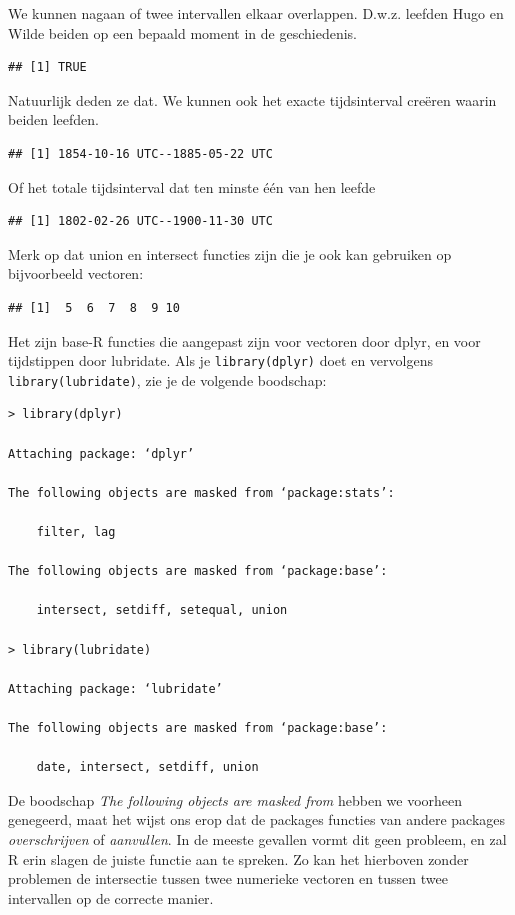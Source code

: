 \documentclass[]{tufte-book}
\begin{document}
We kunnen nagaan of twee intervallen elkaar overlappen. D.w.z. leefden Hugo en Wilde beiden op een bepaald moment in de geschiedenis.

\begin{verbatim}
## [1] TRUE
\end{verbatim}

Natuurlijk deden ze dat. We kunnen ook het exacte tijdsinterval creëren waarin beiden leefden.

\begin{verbatim}
## [1] 1854-10-16 UTC--1885-05-22 UTC
\end{verbatim}

Of het totale tijdsinterval dat ten minste één van hen leefde

\begin{verbatim}
## [1] 1802-02-26 UTC--1900-11-30 UTC
\end{verbatim}

Merk op dat union en intersect functies zijn die je ook kan gebruiken op bijvoorbeeld vectoren:

\begin{verbatim}
## [1]  5  6  7  8  9 10
\end{verbatim}

Het zijn base-R functies die aangepast zijn voor vectoren door dplyr, en voor tijdstippen door lubridate. Als je \texttt{library(dplyr)} doet en vervolgens \texttt{library(lubridate)}, zie je de volgende boodschap:

\begin{verbatim}
> library(dplyr)

Attaching package: ‘dplyr’

The following objects are masked from ‘package:stats’:

    filter, lag

The following objects are masked from ‘package:base’:

    intersect, setdiff, setequal, union

> library(lubridate)

Attaching package: ‘lubridate’

The following objects are masked from ‘package:base’:

    date, intersect, setdiff, union
\end{verbatim}

De boodschap \emph{The following objects are masked from} hebben we voorheen genegeerd, maat het wijst ons erop dat de packages functies van andere packages \emph{overschrijven} of \emph{aanvullen}. In de meeste gevallen vormt dit geen probleem, en zal R erin slagen de juiste functie aan te spreken. Zo kan het hierboven zonder problemen de intersectie tussen twee numerieke vectoren en tussen twee intervallen op de correcte manier.
\end{document}
